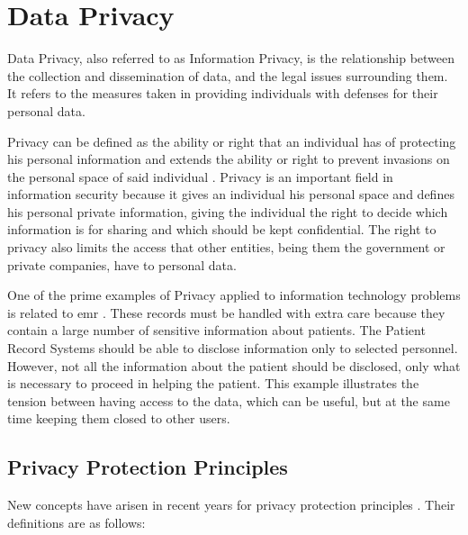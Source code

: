 \section{Data Privacy} 
\label{sec:DataPrivacy}

Data Privacy, also referred to as Information Privacy, is the relationship between the collection and dissemination of data, and the legal issues surrounding them. It refers to the measures taken in providing individuals with defenses for their personal data.

Privacy can be defined as the ability or right that an individual has of protecting his personal information and extends the ability or right to prevent invasions on the personal space of said individual \cite{anderson2008security}.
Privacy is an important field in information security because it gives an individual his personal space and defines his personal private information, giving the individual the right to decide which information is for sharing and which should be kept confidential. The right to privacy also limits the access that other entities, being them the government or private companies, have to personal data.

One of the prime examples of Privacy applied to information technology problems is related to \ac{emr} \cite{Lu2014}. These records must be handled with extra care because they contain a large number of sensitive information about patients. The Patient Record Systems should be able to disclose information only to selected personnel. However, not all the information about the patient should be disclosed, only what is necessary to proceed in helping the patient. This example illustrates the tension between having access to the data, which can be useful, but at the same time keeping them closed to other users.

\subsection{Privacy Protection Principles}
\label{ssec:PrivacyProtectionGoals}

New concepts have arisen in recent years for privacy protection principles \cite{Danezis2015}. Their definitions are as follows:

